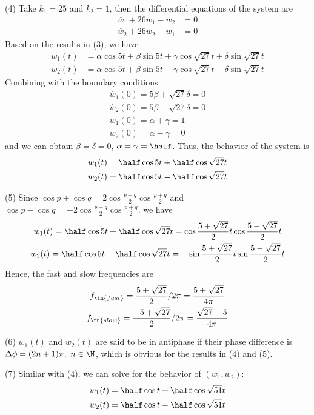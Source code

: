(4) Take $k_1=25$ and $k_2=1$, then the differential equations of the system are
\begin{align}
    \ddot{w_1} + 26w_1 - w_2 &= 0 \\
    \ddot{w_2} + 26w_2 - w_1 &= 0
\end{align}
Based on the results in (3), we have
\begin{align}
    w_1(t) &= \alpha\cos5t + \beta\sin5t + \gamma\cos\sqrt{27}t + \delta\sin\sqrt{27}t\\
    w_2(t) &= \alpha\cos5t + \beta\sin5t - \gamma\cos\sqrt{27}t - \delta\sin\sqrt{27}t
\end{align}
Combining with the boundary conditions
\begin{gather}
    \dot{w_1}(0) = 5\beta + \sqrt{27}\delta = 0 \\
    \dot{w_2}(0) = 5\beta - \sqrt{27}\delta = 0 \\
    w_1(0) = \alpha + \gamma = 1 \\
    w_2(0) = \alpha - \gamma = 0
\end{gather}
and we can obtain $\beta = \delta = 0$, $\alpha = \gamma = \half$. Thus, the behavior of the system is
\begin{gather}
    w_1(t) = \half\cos5t + \half\cos\sqrt{27}t \\
    w_2(t) = \half\cos5t - \half\cos\sqrt{27}t
\end{gather}

(5) Since $\cos{p} + \cos{q} = 2\cos\frac{p-q}{2}\cos\frac{p+q}{2}$ and $\cos{p} - \cos{q} = -2\cos\frac{p-q}{2}\cos\frac{p+q}{2}$. we have
\begin{gather}
    w_1(t) = \half\cos5t + \half\cos\sqrt{27}t = \cos\frac{5+\sqrt{27}}{2}t\cos\frac{5-\sqrt{27}}{2}t \\
    w_2(t) = \half\cos5t - \half\cos\sqrt{27}t = -\sin\frac{5+\sqrt{27}}{2}t\sin\frac{5-\sqrt{27}}{2}t
\end{gather}
Hence, the fast and slow frequencies are 
\begin{gather}
    f_{\tn{fast}} = \frac{5+\sqrt{27}}{2}/2\pi = \frac{5+\sqrt{27}}{4\pi} \\
    f_{\tn{slow}} = \frac{-5+\sqrt{27}}{2}/2\pi = \frac{\sqrt{27}-5}{4\pi}
\end{gather}

(6) $w_1(t)$ and $w_2(t)$ are said to be in antiphase if their phase difference is $\Delta\phi = (2n+1)\pi, ~n\in\N$, which is obvious for the results in (4) and (5).

(7) Similar with (4), we can solve for the behavior of $(w_1,w_2)$:
\begin{gather}
    w_1(t) = \half\cos t + \half\cos\sqrt{51}t \\
    w_2(t) = \half\cos t - \half\cos\sqrt{51}t
\end{gather}


